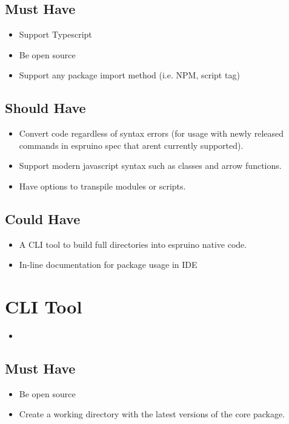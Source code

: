 \documentclass{l4proj}
\begin{document}
\begin{appendices}
\subsection{Must Have}
\begin{itemize}
    \item Support Typescript
    \item Be open source
    \item Support any package import method (i.e. NPM, script tag)

\end{itemize}
\subsection{Should Have}
\begin{itemize}
    \item Convert code regardless of syntax errors (for usage with newly released commands in espruino spec that arent currently supported).
    \item Support modern javascript syntax such as classes and arrow functions.
    \item Have options to transpile modules or scripts.

\end{itemize}
\subsection{Could Have}
\begin{itemize}
    \item A CLI tool to build full directories into espruino native code.
    \item In-line documentation for package usage in IDE

\end{itemize}


\section{CLI Tool}
\begin{itemize}
    \item 
\end{itemize}
\subsection{Must Have}
\begin{itemize}
    \item Be open source
    \item Create a working directory with the latest versions of the core package.


\end{itemize}
\end{appendices}
\end{document}
